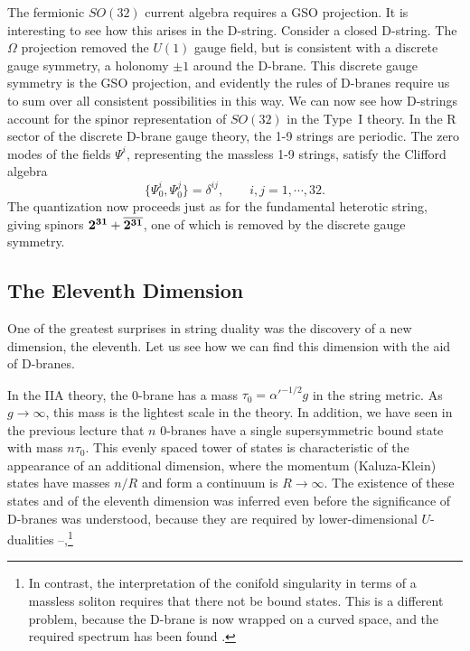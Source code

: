 \documentclass[12pt]{article}
\def\be{\begin{equation}}
\def\ee{\end{equation}}
\def\ap{\alpha'}
\begin{document}
The fermionic $SO(32)$ current algebra requires a GSO projection.  It is
interesting to see how this arises in the D-string.  Consider a closed
D-string.  The $\Omega$ projection removed the $U(1)$ gauge field, but is
consistent with a discrete gauge symmetry, a holonomy $\pm 1$ around the
D-brane.  This discrete gauge symmetry is the GSO projection, and evidently
the rules of D-branes require us to sum over all consistent possibilities in
this way.
We can now see how D-strings account for the spinor
representation of $SO(32)$ in the Type~I theory.  In the {R} sector of
the discrete D-brane gauge theory, the
1-9 strings are periodic.  The zero modes of the fields $\Psi^i$,
representing the massless
1-9 strings, satisfy the Clifford algebra
\be
\{ \Psi^i_0 , \Psi^j_0 \} = \delta^{ij}, \qquad i,j= 1,
\cdots , 32 .
\ee
The quantization now proceeds just as for the fundamental heterotic string,
giving spinors ${\bf 2^{31}} + \overline{\bf  2^{31}}$, one of which is
removed by the discrete gauge symmetry.

\subsection{The Eleventh Dimension}

One of the greatest surprises in string duality was the
discovery of a new dimension, the eleventh.  Let us see how we can find this
dimension with the aid of D-branes. 


In the IIA theory, the 0-brane has a mass
$\tau_0 = \ap^{-1/2}g$ in the string metric.  As $g \to \infty$, this
mass is the lightest scale in the theory.  In addition, we have seen in the
previous lecture that $n$
0-branes have a single supersymmetric bound state with mass $n\tau_0$. 
This evenly spaced tower of states is characteristic of the appearance of an
additional dimension, where the momentum (Kaluza-Klein) states have masses
$n/R$ and form a continuum is $R \to \infty$.  The existence of these
states and of the eleventh dimension was inferred even before the significance
of D-branes was understood, because they are required by lower-dimensional
$U$-dualities \cite{town}--\cite{wit},\footnote
{In contrast, the interpretation of the conifold singularity in terms of a
massless soliton requires that there not be bound states.  This is a
different problem, because the D-brane is now wrapped on a curved space,
and the required spectrum has been found \cite{bsv}.} 
\end{document}
